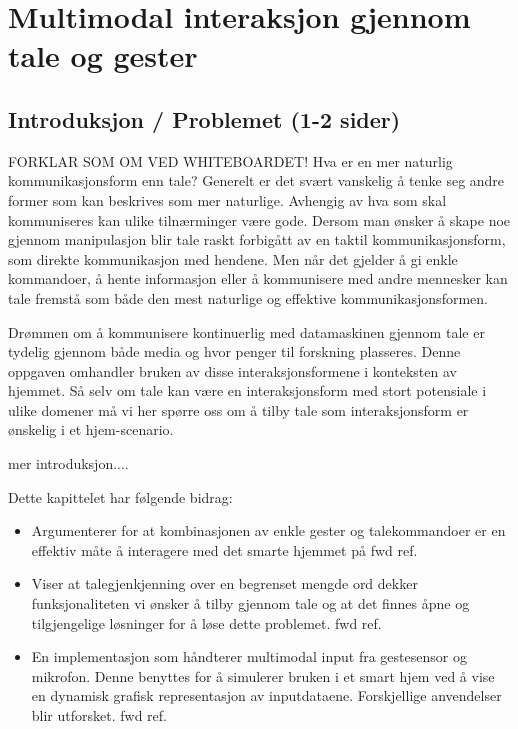 \section{Multimodal interaksjon gjennom tale og gester}
\subsection{Introduksjon / Problemet (1-2 sider)}
{\color{red} FORKLAR SOM OM VED WHITEBOARDET!}
Hva er en mer naturlig kommunikasjonsform enn tale? Generelt er det svært vanskelig å tenke seg andre former som kan beskrives som mer naturlige. Avhengig av hva som skal kommuniseres kan ulike tilnærminger være gode. Dersom man ønsker å skape noe gjennom manipulasjon blir tale raskt forbigått av en taktil kommunikasjonsform, som direkte kommunikasjon med hendene. Men når det gjelder å gi enkle kommandoer, å hente informasjon eller å kommunisere med andre mennesker kan tale fremstå som både den mest naturlige og effektive kommunikasjonsformen.

Drømmen om å kommunisere kontinuerlig med datamaskinen gjennom tale er tydelig gjennom både media og hvor penger til forskning plasseres. Denne oppgaven omhandler bruken av disse interaksjonsformene i konteksten av hjemmet. Så selv om tale kan være en interaksjonsform med stort potensiale i ulike domener må vi her spørre oss om å tilby tale som interaksjonsform er ønskelig i et hjem-scenario. 

{\color{red}mer introduksjon....}

Dette kapittelet har følgende bidrag:
\begin{itemize}
\item Argumenterer for at kombinasjonen av enkle gester og talekommandoer er en effektiv måte å interagere med det smarte hjemmet på {\color{red} fwd ref}.
\item Viser at talegjenkjenning over en begrenset mengde ord dekker funksjonaliteten vi ønsker å tilby gjennom tale og at det finnes åpne og tilgjengelige løsninger for å løse dette problemet.{\color{red} fwd ref}.
\item En implementasjon som håndterer multimodal input fra gestesensor og mikrofon. Denne benyttes for å simulerer bruken i et smart hjem ved å vise en dynamisk grafisk representasjon av inputdataene. Forskjellige anvendelser blir utforsket. {\color{red} fwd ref}.
\end{itemize}

